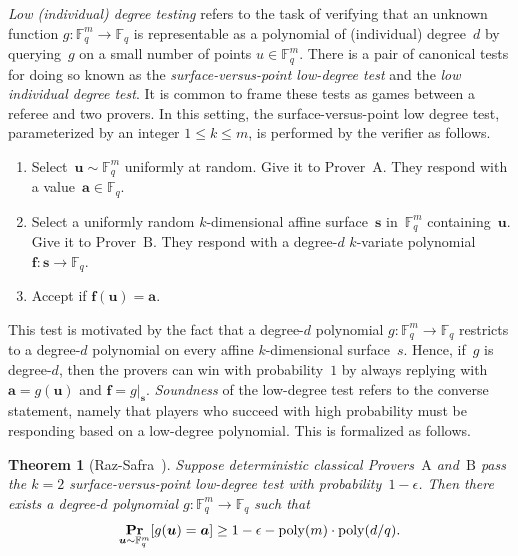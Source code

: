 \documentclass[11pt]{article}
\newtheorem{theorem}{Theorem}[section]
\theoremstyle{definition}
\renewcommand{\Pr}{\mathop{\bf Pr\/}}
\newcommand{\poly}{\mathrm{poly}}
\newcommand{\F}{\mathbb F}
\newcommand{\eps}{\epsilon}
\newcommand{\ba}{\boldsymbol{a}}
\newcommand{\boldf}{\boldsymbol{f}}
\newcommand{\bs}{\boldsymbol{s}}
\newcommand{\bu}{\boldsymbol{u}}
\begin{document}
\emph{Low (individual) degree testing} refers to the task
of verifying that an unknown function $g:\F_q^m \rightarrow \F_q$
is representable as a polynomial of (individual) degree~$d$
by querying~$g$ on a small number of points $u \in \F_q^m$.
There is a pair of canonical tests for doing so
known as the \emph{surface-versus-point low-degree test}
and the \emph{low individual degree test}.
It is common to frame these tests
as games between a referee and two provers.
In this setting, the surface-versus-point low degree test, parameterized by an integer $1\leq k\leq m$, is performed by the verifier as follows.
\begin{enumerate}
\item Select~$\bu \sim \F_q^m$ uniformly at random. Give it to Prover~$\mathrm{A}$. They respond with a value~$\ba \in \F_q$.
\item Select a uniformly random $k$-dimensional affine surface~$\bs$ in~$\F_q^m$ containing~$\bu$.
	Give it to Prover~$\mathrm{B}$. They respond with a degree-$d$ $k$-variate polynomial $\boldf:\bs\rightarrow \F_q$.
\item Accept if $\boldf(\bu) = \ba$.
\end{enumerate}
This test is motivated by the fact that a degree-$d$ polynomial
$g:\F_q^m\rightarrow\F_q$ restricts to a degree-$d$ polynomial
on every affine $k$-dimensional surface~$s$.
Hence, if~$g$ is degree-$d$,
then the provers can win with probability~$1$ by always replying with~$\ba = g(\bu)$ and $\boldf = g|_{\bs}$.
\emph{Soundness} of the low-degree test refers to the converse statement,
namely that players who succeed with high probability
must be responding based on a low-degree polynomial.
This is formalized as follows.

\begin{theorem}[Raz-Safra~\cite{RS97}]\label{thm:raz-safra}
Suppose deterministic classical Provers~$\mathrm{A}$ and~$\mathrm{B}$ pass the $k = 2$ surface-versus-point low-degree test with probability~$1-\eps$.
Then there exists a degree-$d$ polynomial $g:\F_q^m \rightarrow \F_q$ such that
\begin{equation*}
\Pr_{\bu \sim \F_q^m}[g(\bu) = \ba] \geq 1 - \eps - \poly(m) \cdot \poly(d/q).
\end{equation*}
\end{theorem}
\end{document}
